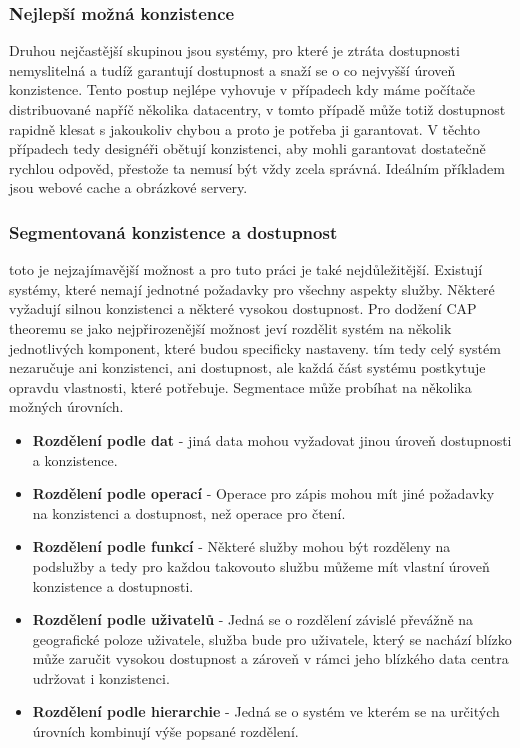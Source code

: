 \documentclass[thesis=M,czech]{FITthesis}[2012/06/26]
\begin{document}
\subsubsection{Nejlepší možná konzistence} 
Druhou nejčastější skupinou jsou systémy, pro které je ztráta dostupnosti nemyslitelná a tudíž garantují dostupnost a snaží se o co nejvyšší úroveň konzistence. Tento postup nejlépe vyhovuje v případech kdy máme počítače distribuované napříč několika datacentry, v tomto případě může totiž dostupnost rapidně klesat s jakoukoliv chybou a proto je potřeba ji garantovat. V těchto případech tedy designéři obětují konzistenci, aby mohli garantovat dostatečně rychlou odpověd, přestože ta nemusí být vždy zcela správná. Ideálním příkladem jsou webové cache a obrázkové servery.

\subsubsection{Segmentovaná konzistence a dostupnost}
toto je nejzajímavější možnost a pro tuto práci je také nejdůležitější. Existují systémy, které nemají jednotné požadavky pro všechny aspekty služby. Některé vyžadují silnou konzistenci a některé vysokou dostupnost. Pro dodžení CAP theoremu se  jako nejpřirozenější možnost jeví rozdělit systém na několik jednotlivých komponent, které budou specificky nastaveny. tím tedy celý systém nezaručuje ani konzistenci, ani dostupnost, ale každá část systému postkytuje opravdu vlastnosti, které potřebuje. Segmentace může probíhat na několika možných úrovních. 

\begin{itemize}
\item \textbf{Rozdělení podle dat} - jiná data mohou vyžadovat jinou úroveň dostupnosti a konzistence.
\item \textbf{Rozdělení podle operací} - Operace pro zápis mohou mít jiné požadavky na konzistenci a dostupnost, než operace pro čtení.
\item \textbf{Rozdělení podle funkcí} - Některé služby mohou být rozděleny na podslužby a tedy pro každou takovouto službu můžeme mít vlastní úroveň konzistence a dostupnosti. 
\item \textbf{Rozdělení podle uživatelů} - Jedná se o rozdělení závislé převážně na geografické poloze uživatele, služba bude pro uživatele, který se nachází blízko může zaručit vysokou dostupnost a zároveň v rámci jeho blízkého data centra udržovat i konzistenci. 
\item \textbf{Rozdělení podle hierarchie} - Jedná se o systém ve kterém se na určitých úrovních kombinují výše popsané rozdělení.
 
\end{itemize}
\end{document}
